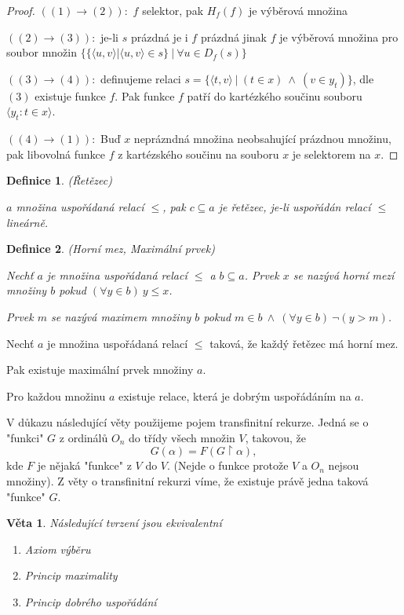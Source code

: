 \documentclass[a4paper,10pt,titlepage]{article} \usepackage[utf8]{inputenc}
\newtheorem{theorem}{Věta}
\newtheorem{define}{Definice}
\begin{document}
\begin{proof}
$((1)\rightarrow(2)):$ $f$ selektor, pak $H_f(f)$ je výběrová množina

$((2)\rightarrow(3)):$ je-li $s$ prázdná je i $f$ prázdná jinak $f$ je výběrová množina pro soubor množin
$\{ \{\langle u , v \rangle | \langle u , v \rangle  \in s\}\ |\ \forall u \in D_f(s) \}$

$((3)\rightarrow(4)):$ definujeme relaci $s = \{\langle t , v \rangle  \ |\ (t\in x) \ \wedge\ (v \in y_t) \}$, dle $(3)$ existuje funkce $f$.
Pak funkce $f$ patří do kartézkého součinu souboru $\langle y_t : t \in x \rangle$.

$((4)\rightarrow(1)):$ Buď $x$ neprázndná množina neobsahující prázdnou množinu, pak libovolná funkce $f$ z kartézského součinu na souboru $x$
je selektorem na $x$.
\end{proof}

\begin{define}
(Řetězec)

$a$ množina uspořádaná relací $\leq$, pak $c \subseteq a$ je řetězec, je-li uspořádán relací $\leq$ lineárně.
\end{define}

\begin{define}
(Horní mez, Maximální prvek)

Nechť $a$ je množina uspořádaná relací $\leq$ a $b\subseteq a$. 
Prvek $x$ se nazývá horní mezí množiny $b$ pokud $(\forall y \in b)\ y\leq x$.

Prvek $m$ se nazývá maximem množiny $b$ pokud $m \in b \ \wedge \ (\forall y \in b) \ \neg(y > m)$.
\end{define}

\medskip
{}

Nechť $a$ je množina uspořádaná relací $\leq$ taková, že každý řetězec má horní mez.

Pak existuje maximální prvek množiny $a$.

\medskip
{}

Pro každou množinu $a$ existuje relace, která je dobrým uspořádáním na $a$.

\medskip

V důkazu následující věty použijeme pojem transfinitní rekurze. 
Jedná se o "funkci" $G$ z ordinálů $O_n$ do třídy všech množin $V$,
takovou, že
\[
	G(\alpha) = F(G \upharpoonright \alpha),
\]
kde $F$ je nějaká "funkce" z $V$ do $V$. (Nejde o funkce protože $V$ a $O_n$ nejsou množiny).
Z věty o transfinitní rekurzi víme, že existuje právě jedna taková "funkce" $G$.
\begin{theorem}
Následující tvrzení jsou ekvivalentní
\begin{enumerate}
\item Axiom výběru
\item Princip maximality
\item Princip dobrého uspořádání
\end{enumerate}
\end{theorem}
\end{document}
